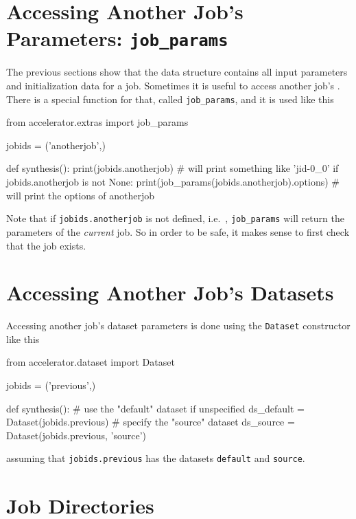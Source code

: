 \section{Accessing Another Job's Parameters:  \texttt{job\_params}}

The previous sections show that the \params data structure
contains all input parameters and initialization data for a job.
Sometimes it is useful to access another job's \params.  There is a
special function for that, called \texttt{job\_params}, and it is used
like this
\begin{python}
from accelerator.extras import job_params

jobids = ('anotherjob',)

def synthesis():
    print(jobids.anotherjob)
    # will print something like 'jid-0_0'
    if jobids.anotherjob is not None:
        print(job_params(jobids.anotherjob).options)
        # will print the options of anotherjob
\end{python}
Note that if \texttt{jobids.anotherjob} is not defined, i.e.\ \pyNone,
\texttt{job\_params} will return the parameters of the
\textsl{current} job.  So in order to be safe, it makes sense to first
check that the job exists.



\section{Accessing Another Job's Datasets}
Accessing another job's dataset parameters is done using the
\texttt{Dataset} constructor like this
\begin{python}
from accelerator.dataset import Dataset

jobids = ('previous',)

def synthesis():
    # use the "default" dataset if unspecified
    ds_default = Dataset(jobids.previous)
    # specify the "source" dataset
    ds_source = Dataset(jobids.previous, 'source')
\end{python}
assuming that \texttt{jobids.previous} has the datasets
\texttt{default} and \texttt{source}.




\section{Job Directories}
\label{sec:job_directories}

